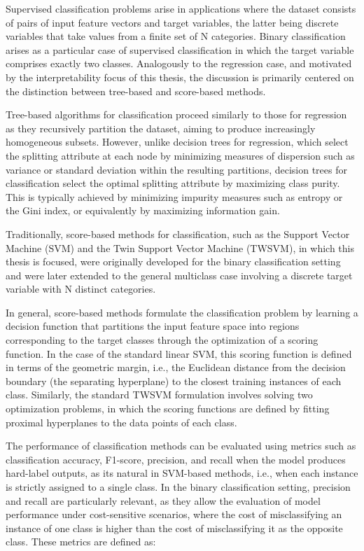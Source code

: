 \documentclass[12pt]{report} %
\begin{document}
Supervised classification problems arise in applications where the dataset consists of pairs of input feature vectors and target variables, the latter being discrete variables that take values from a finite set of N categories. Binary classification arises as a particular case of supervised classification in which the target variable comprises exactly two classes. Analogously to the regression case, and motivated by the interpretability focus of this thesis, the discussion is primarily centered on the distinction between tree-based and score-based methods.

Tree-based algorithms for classification proceed similarly to those for regression as they recursively partition the dataset, aiming to produce increasingly homogeneous subsets. However, unlike decision trees for regression, which select the splitting attribute at each node by minimizing measures of dispersion such as variance or standard deviation within the resulting partitions, decision trees for classification select the optimal splitting attribute by maximizing class purity. This is typically achieved by minimizing impurity measures such as entropy or the Gini index, or equivalently by maximizing information gain.

Traditionally, score-based methods for classification, such as the Support Vector Machine (SVM) and the Twin Support Vector Machine (TWSVM), in which this thesis is focused, were originally developed for the binary classification setting and were later extended to the general multiclass case involving a discrete target variable with N distinct categories. 

\newpage

In general, score-based methods formulate the classification problem by learning a decision function that partitions the input feature space into regions corresponding to the target classes through the optimization of a scoring function. In the case of the standard linear SVM, this scoring function is defined in terms of the geometric margin, i.e., the Euclidean distance from the decision boundary (the separating hyperplane) to the closest training instances of each class. Similarly, the standard TWSVM formulation involves solving two optimization problems, in which the scoring functions are defined by fitting proximal hyperplanes to the data points of each class.

The performance of classification methods can be evaluated using metrics such as classification accuracy, F1-score, precision, and recall when the model produces hard-label outputs, as its natural in SVM-based methods, i.e., when each instance is strictly assigned to a single class. In the binary classification setting, precision and recall are particularly relevant, as they allow the evaluation of model performance under cost-sensitive scenarios, where the cost of misclassifying an instance of one class is higher than the cost of misclassifying it as the opposite class. These metrics are defined as:
\end{document}
